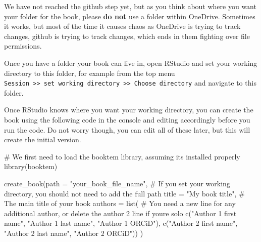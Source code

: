 \documentclass[
  letterpaper,
  DIV=11,
  numbers=noendperiod]{scrreprt}
\newenvironment{Shaded}{\begin{snugshade}}{\end{snugshade}}
\newcommand{\AttributeTok}[1]{\textcolor[rgb]{0.40,0.45,0.13}{#1}}
\newcommand{\CommentTok}[1]{\textcolor[rgb]{0.37,0.37,0.37}{#1}}
\newcommand{\FunctionTok}[1]{\textcolor[rgb]{0.28,0.35,0.67}{#1}}
\newcommand{\NormalTok}[1]{\textcolor[rgb]{0.00,0.23,0.31}{#1}}
\newcommand{\StringTok}[1]{\textcolor[rgb]{0.13,0.47,0.30}{#1}}
\begin{document}
\begin{tcolorbox}[enhanced jigsaw, colbacktitle=quarto-callout-warning-color!10!white, titlerule=0mm, leftrule=.75mm, title=\textcolor{quarto-callout-warning-color}{\faExclamationTriangle}\hspace{0.5em}{Do not create github repositories within OneDrive}, breakable, bottomrule=.15mm, opacitybacktitle=0.6, rightrule=.15mm, opacityback=0, arc=.35mm, colframe=quarto-callout-warning-color-frame, toptitle=1mm, bottomtitle=1mm, toprule=.15mm, left=2mm, colback=white, coltitle=black]

We have not reached the github step yet, but as you think about where
you want your folder for the book, please \textbf{do not} use a folder
within OneDrive. Sometimes it works, but most of the time it causes
chaos as OneDrive is trying to track changes, github is trying to track
changes, which ends in them fighting over file permissions.

\end{tcolorbox}

Once you have a folder your book can live in, open RStudio and set your
working directory to this folder, for example from the top menu
\texttt{Session\ \textgreater{}\textgreater{}\ set\ working\ directory\ \textgreater{}\textgreater{}\ Choose\ directory}
and navigate to this folder.

Once RStudio knows where you want your working directory, you can create
the book using the following code in the console and editing accordingly
before you run the code. Do not worry though, you can edit all of these
later, but this will create the initial version.

\begin{Shaded}
\begin{Highlighting}[]
\CommentTok{\# We first need to load the booktem library, assuming its installed properly}
\FunctionTok{library}\NormalTok{(booktem)}

\FunctionTok{create\_book}\NormalTok{(}\AttributeTok{path =} \StringTok{"your\_book\_file\_name"}\NormalTok{, }\CommentTok{\# If you set your working directory, you should not need to add the full path}
            \AttributeTok{title =} \StringTok{"My book title"}\NormalTok{, }\CommentTok{\# The main title of your book}
            \AttributeTok{authors =} \FunctionTok{list}\NormalTok{( }\CommentTok{\# You need a new line for any additional author, or delete the author 2 line if you\textquotesingle{}re solo}
              \FunctionTok{c}\NormalTok{(}\StringTok{"Author 1 first name"}\NormalTok{, }\StringTok{"Author 1 last name"}\NormalTok{, }\StringTok{"Author 1 ORCiD"}\NormalTok{),}
              \FunctionTok{c}\NormalTok{(}\StringTok{"Author 2 first name"}\NormalTok{, }\StringTok{"Author 2 last name"}\NormalTok{, }\StringTok{"Author 2 ORCiD"}\NormalTok{))}
\NormalTok{            )}
\end{Highlighting}
\end{Shaded}
\end{document}
